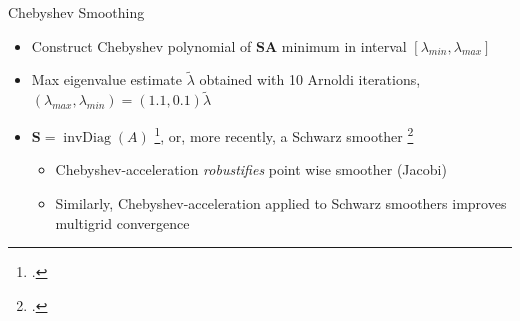 \begin{frame}{Chebyshev Smoothing}
\begin{itemize}
  \item Construct Chebyshev polynomial of $\mathbf {SA}$ minimum in interval $[\lambda_{min}, \lambda_{max}]$
  \item Max eigenvalue estimate $\tilde{\lambda}$ obtained with 10 Arnoldi iterations,
        $(\lambda_{max}, \lambda_{min}) = (1.1,0.1)\tilde{\lambda}$
  \item $\mathbf S = \operatorname{invDiag}(A)$ \footcite{adams_parallel_2003, Kronbichler2019}, or, more recently, a Schwarz smoother \footcite{phillips-tuning-2022}
  \begin{itemize}
    \item Chebyshev-acceleration \emph{robustifies} point wise smoother (Jacobi)
    \item Similarly, Chebyshev-acceleration applied to Schwarz smoothers improves multigrid convergence
  \end{itemize}
\end{itemize}
\end{frame}